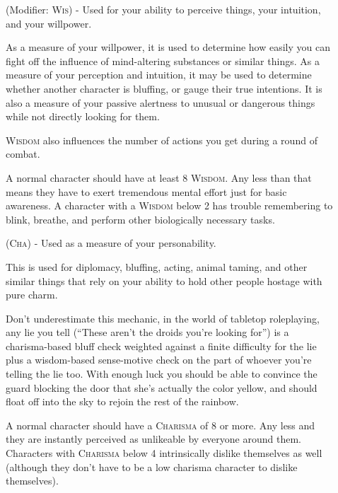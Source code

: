 \begin{description}
\item[] (Modifier: \textsc{Wis}) - Used for your ability to perceive things, your intuition, and your willpower.

As a measure of your willpower, it is used to determine how easily you can fight off the influence of mind-altering substances or similar things. As a measure of your perception and intuition, it may be used to determine whether another character is bluffing, or gauge their true intentions. It is also a measure of your passive alertness to unusual or dangerous things while not directly looking for them. 

\textsc{Wisdom} also influences the number of actions you get during a round of combat.

A normal character should have at least 8 \textsc{Wisdom}. Any less than that means they have to exert tremendous mental effort just for basic awareness. A character with a \textsc{Wisdom} below 2 has trouble remembering to blink, breathe, and perform other biologically necessary tasks.

\item[] (\textsc{Cha}) - Used as a measure of your personability.

This is used for diplomacy, bluffing, acting, animal taming, and other similar things that rely on your ability to hold other people hostage with pure charm.

Don't underestimate this mechanic, in the world of tabletop roleplaying, any lie you tell (``These aren’t the droids you’re looking for'') is a charisma-based bluff check weighted against a finite difficulty for the lie plus a wisdom-based sense-motive check on the part of whoever you're telling the lie too. With enough luck you should be able to convince the guard blocking the door that she's actually the color yellow, and should float off into the sky to rejoin the rest of the rainbow.

A normal character should have a \textsc{Charisma} of 8 or more. Any less and they are instantly perceived as unlikeable by everyone around them. Characters with \textsc{Charisma} below 4 intrinsically dislike themselves as well (although they don't have to be a low charisma character to dislike themselves).
\end{description}

